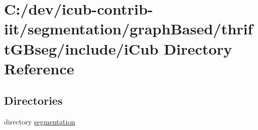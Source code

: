 \section{C\+:/dev/icub-\/contrib-\/iit/segmentation/graph\+Based/thrift\+G\+Bseg/include/i\+Cub Directory Reference}
\label{dir_b2d575b068a897e576cb9bb696d4526f}
\subsection*{Directories}
\begin{DoxyCompactItemize}
\item 
directory \hyperlink{dir_9e9d575fed5e69c17d1b236de0577146}{segmentation}
\end{DoxyCompactItemize}
